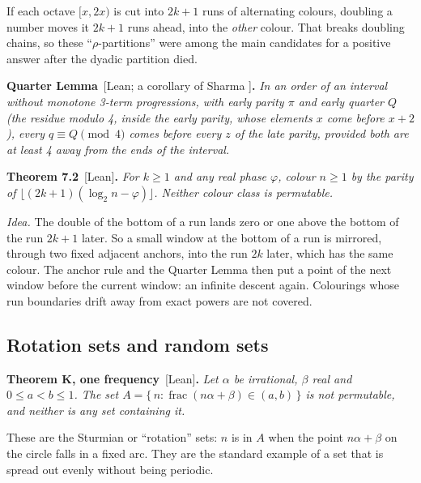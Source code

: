 \documentclass[11pt,letterpaper]{article}
\newcommand{\fr}{\operatorname{frac}}
\newcommand{\st}[1]{\textnormal{\textsf{\small[#1]}}}
\newenvironment{result}[2]%
  {\par\medskip\noindent\textbf{#1}\ \st{#2}\textbf{.}\enspace\itshape}%
  {\par\medskip}
\newcommand{\idea}[1]{\par\smallskip\noindent\textit{#1.}\enspace}
\begin{document}
If each octave $[x, 2x)$ is cut into $2k+1$ runs of alternating colours, doubling a number moves it $2k+1$
runs ahead, into the \emph{other} colour. That breaks doubling chains, so these ``$\rho$-partitions'' were
among the main candidates for a positive answer after the dyadic partition died.

\begin{result}{Quarter Lemma}{Lean; a corollary of Sharma \cite{Sharma}}
In an order of an interval without monotone 3-term progressions, with early parity $\pi$ and \emph{early
quarter} $Q$ (the residue modulo 4, inside the early parity, whose elements $x$ come before $x+2$), every
$q \equiv Q \pmod 4$ comes before every $z$ of the late parity, provided both are at least 4 away from the
ends of the interval.
\end{result}

\begin{result}{Theorem 7.2}{Lean}
For $k \ge 1$ and any real phase $\varphi$, colour $n \ge 1$ by the parity of
$\lfloor (2k+1)(\log_2 n - \varphi) \rfloor$. Neither colour class is permutable.
\end{result}

\idea{Idea} The double of the bottom of a run lands zero or one above the bottom of the run $2k+1$ later. So
a small window at the bottom of a run is mirrored, through two fixed adjacent anchors, into the run $2k$
later, which has the same colour. The anchor rule and the Quarter Lemma then put a point of the next window
before the current window: an infinite descent again. Colourings whose run boundaries drift away from exact
powers are not covered.

\subsection{Rotation sets and random sets}

\begin{result}{Theorem K, one frequency}{Lean}
Let $\alpha$ be irrational, $\beta$ real and $0 \le a < b \le 1$. The set
$A = \{\, n : \fr(n\alpha+\beta) \in (a,b) \,\}$ is not permutable, and neither is any set containing it.
\end{result}

These are the Sturmian or ``rotation'' sets: $n$ is in $A$ when the point $n\alpha+\beta$ on the circle
falls in a fixed arc. They are the standard example of a set that is spread out evenly without being
periodic.
\end{document}
